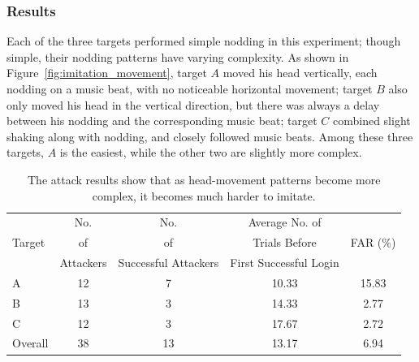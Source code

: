 \subsubsection{Results}
Each of the three targets performed simple nodding in this experiment; though simple, their nodding patterns have varying complexity. As shown in Figure~\ref{fig:imitation_movement}, target $A$ moved his head vertically, each nodding on a music beat, with no noticeable horizontal movement; target $B$ also only moved his head in the vertical direction, but there was always a delay between his nodding and the corresponding music beat; target $C$ combined slight shaking along with nodding, and closely followed music beats. Among these three targets, $A$ is the easiest, while the other two are slightly more complex.

\begin{table}[b]
\centering
\begin{tabular}{|l|c|c|c|c|}\hline
                               & No. &  No. &  Average No. of  &  \\
Target & of & of & Trials Before & FAR (\%) \\
& Attackers & Successful Attackers & First Successful Login & \\\hline

A                   & 12                                 & 7                                                                     & 10.33                                                                                               & 15.83                        \\ \hline

B                   & 13                                 & 3                                                                     & 14.33                                                                                               & 2.77                         \\ \hline

C                   & 12                                 & 3                                                                     & 17.67                                                                                               & 2.72                          \\ \hline\hline

Overall & 38                                 & 13                                                                    & 13.17                                                                                                    & 6.94                         \\ \hline
\end{tabular}

\caption{\label{tab:imitation} The attack results show that as head-movement patterns become more complex, it becomes much harder to imitate. }

\end{table}


